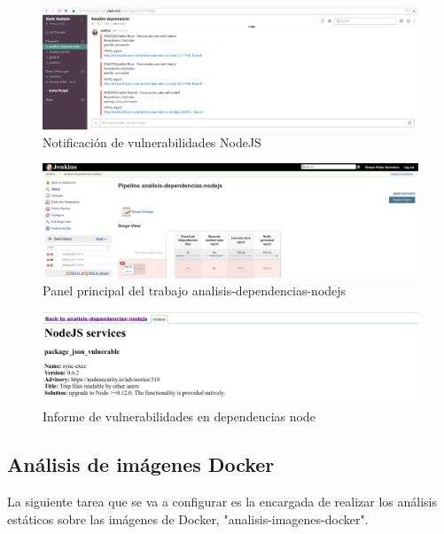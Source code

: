 \begin{figure}[htbp]
	\centering
	\includegraphics[width=1.0\linewidth]
	{desarrollo/figuras/slack_02.png}
	\caption{Notificación de vulnerabilidades NodeJS}
	\label{slack_02}
\end{figure}

\begin{figure}[H]
	\centering
	\includegraphics[width=1.0\linewidth]
	{desarrollo/figuras/node_01.png}
	\caption{Panel principal del trabajo analisis-dependencias-nodejs}
	\label{node_01}
\end{figure}

\begin{figure}[H]
	\centering
	\includegraphics[width=1.00\linewidth]
	{desarrollo/figuras/node_02.png}
	\caption{Informe de vulnerabilidades en dependencias node}
	\label{node_02}
\end{figure}


\subsection{Análisis de imágenes Docker}

La siguiente tarea que se va a configurar es la encargada de realizar los análisis estáticos sobre las imágenes de Docker, "analisis-imagenes-docker".

